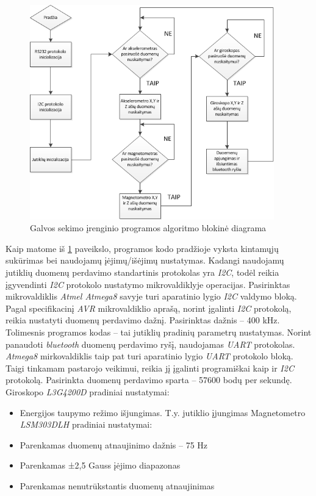 \documentclass[]{vgtuef}
\begin{document}
\begin{figure}[!ht]
  \centering
  \includegraphics[width=400px]{img/head_tracker.png}
  \caption{Galvos sekimo įrenginio programos algoritmo blokinė diagrama}
  \label{fig:head_tracker}
\end{figure}

Kaip matome iš \ref{fig:head_tracker} paveikslo, programos kodo pradžioje vyksta kintamųjų sukūrimas bei naudojamų įėjimų/išėjimų nustatymas. Kadangi naudojamų jutiklių duomenų perdavimo standartinis protokolas yra \textit{I2C}, todėl reikia įgyvendinti \textit{I2C} protokolo nustatymo mikrovaldiklyje operacijas. Pasirinktas mikrovaldiklis \textit{Atmel Atmega8} savyje turi aparatinio lygio \textit{I2C} valdymo bloką. Pagal specifikacinį \textit{AVR} mikrovaldiklio aprašą, norint įgalinti \textit{I2C} protokolą, reikia nustatyti duomenų perdavimo dažnį. Pasirinktas dažnis – 400 kHz. Tolimesnis programos kodas – tai jutiklių pradinių parametrų nustatymas. Norint panaudoti \textit{bluetooth} duomenų perdavimo ryšį, naudojamas \textit{UART} protokolas. \textit{Atmega8} mirkovaldiklis taip pat turi aparatinio lygio \textit{UART} protokolo bloką. Taigi tinkamam pastarojo veikimui, reikia jį įgalinti programiškai kaip ir \textit{I2C} protokolą. Pasirinkta duomenų perdavimo sparta – 57600 bodų per sekundę.
Giroskopo \textit{L3G4200D} pradiniai nustatymai:

\begin{itemize}
\item Energijos taupymo režimo išjungimas. T.y. jutiklio įjungimas
Magnetometro \textit{LSM303DLH} pradiniai nustatymai:
\item Parenkamas duomenų atnaujinimo dažnis – 75 Hz
\item Parenkamas ±2,5 Gauss įėjimo diapazonas
\item Parenkamas nenutrūkstantis duomenų atnaujinimas
\end{itemize}
\end{document}
